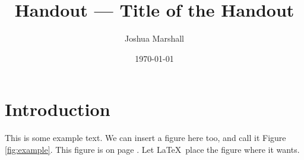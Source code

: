 \documentclass[12pt,letterpaper,fleqn,oneside]{qu-handout}
\begin{document}
\pagestyle{plain}


\renewcommand{\institution}{Queen's University at Kingston, Canada}
\renewcommand{\coursetitle}{ELEC 443 Linear Control Systems}
\renewcommand{\term}{Fall 2019}


\title{Handout --- Title of the Handout}
\author{Joshua Marshall}
\date{\today}


\thispagestyle{title}

\begin{shaded}
  \begin{center}
    \Large\bf\thetitle
  \end{center}
\end{shaded}


\tableofcontents


\section{Introduction}

This is some example text.  We can insert a figure here too, and call it Figure \ref{fig:example}.  This figure is on page \pageref{fig:example}.  Let \LaTeX\ place the figure where it wants.  
\end{document}

